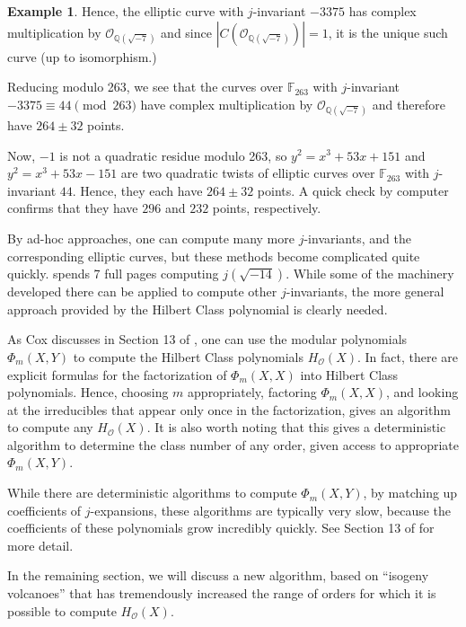 \documentclass{amsart}
\theoremstyle{definition}
\newtheorem{example}[thm]{Example}
\theoremstyle{remark}
\numberwithin{equation}{section}
\newcommand{\cO}{\mathcal O}
\newcommand{\bbF}{\mathbb F}
\newcommand{\bbQ}{\mathbb Q}
\begin{document}
\begin{example}
 Hence, the elliptic curve with $j$-invariant $-3375$ has complex multiplication by $\cO_{\bbQ(\sqrt{-7})}$ and since $|C(\cO_{\bbQ(\sqrt{-7})})| = 1$, it is the unique such curve (up to isomorphism.)


Reducing modulo 263, we see that the curves over $\bbF_{263}$ with $j$-invariant $-3375 \equiv 44 \pmod{263}$ have complex multiplication by $\cO_{\bbQ(\sqrt{-7})}$ and therefore have $264 \pm 32$ points.

Now, $-1$ is not a quadratic residue modulo 263, so $y^2 = x^3 + 53 x + 151$ and $y^2 = x^3 + 53 x - 151$ are two quadratic twists of elliptic curves over $\bbF_{263}$ with $j$-invariant $44$. Hence, they each have $264 \pm 32$ points. A quick check by computer confirms that they have $296$ and $232$ points, respectively.
\end{example}
 
 By ad-hoc approaches, one can compute many more $j$-invariants, and the corresponding elliptic curves, but these methods become complicated quite quickly. \cite{CoxPrimes} spends 7 full pages computing $j(\sqrt{-14})$. While some of the machinery developed there can be applied to compute other $j$-invariants, the more general approach provided by the Hilbert Class polynomial is clearly needed.
 
 As Cox discusses in Section 13 of \cite{CoxPrimes}, one can use the modular polynomials $\Phi_{m}(X,Y)$ to compute the Hilbert Class polynomials $H_{\cO}(X)$. In fact, there are explicit formulas for the factorization of $\Phi_{m}(X,X)$ into Hilbert Class polynomials. Hence,  choosing $m$ appropriately, factoring $\Phi_{m}(X,X)$, and looking at the irreducibles that appear only once in the factorization, gives an algorithm to compute any $H_{\cO}(X)$. It is also worth noting that this gives a deterministic algorithm to determine the class number of any order, given access to appropriate $\Phi_{m}(X,Y)$.
 
 While there are deterministic algorithms to compute $\Phi_{m}(X,Y)$, by matching up coefficients of $j$-expansions, these algorithms are typically very slow, because the coefficients of these polynomials grow incredibly quickly. See Section 13 of \cite{CoxPrimes} for more detail.
 
 In the remaining section, we will discuss a new algorithm, based on ``isogeny volcanoes'' that has tremendously increased the range of orders for which it is possible to compute $H_{\cO}(X)$.

\end{document}
